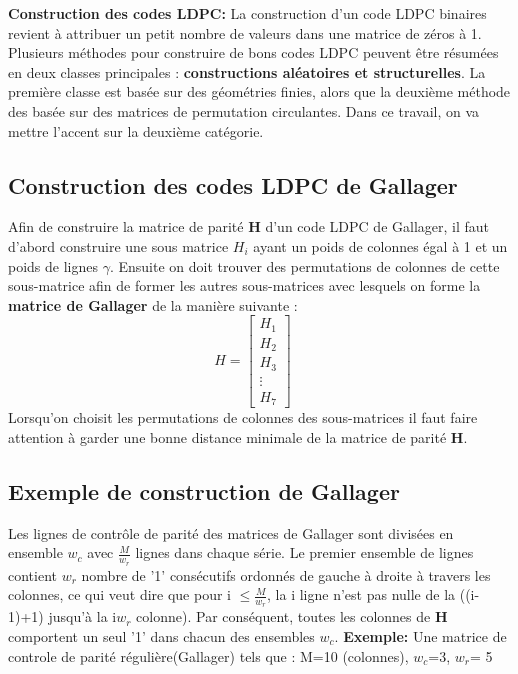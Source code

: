 \documentclass[french,nochapter,11pt]{rapportUB}
\begin{document}
\textbf{Construction des codes LDPC:} La construction d'un code LDPC binaires revient à attribuer un petit nombre de valeurs dans une matrice de zéros à 1. Plusieurs méthodes pour construire de bons codes LDPC peuvent être résumées en deux classes principales : \textbf{constructions aléatoires et structurelles}.
La première classe est basée sur des géométries finies, alors que la deuxième méthode des basée sur des matrices de permutation circulantes. \newline
Dans ce travail, on va mettre l'accent sur la deuxième catégorie. \newline
\subsection{Construction des codes LDPC de Gallager}
Afin de construire la matrice de parité \textbf{H} d'un code LDPC de Gallager, il faut d'abord construire une sous matrice \textbf{$H_i$} ayant un poids de colonnes égal à 1 et un poids de lignes $\gamma$. Ensuite on doit trouver des permutations de colonnes de cette sous-matrice afin de former les autres sous-matrices avec lesquels on forme la \textbf{matrice de Gallager} de la manière suivante :
$$H=
\begin{bmatrix}
  H_1 \\
  H_2 \\
  H_3 \\
  \vdots \\
  H_7
\end{bmatrix}
\quad
$$
\newline
Lorsqu'on choisit les permutations de colonnes des sous-matrices il faut faire attention à garder une bonne distance minimale de la matrice de parité \textbf{H}.
\subsection{Exemple de construction de Gallager}
Les lignes de contrôle de parité des matrices de Gallager sont divisées en ensemble $w_c$ avec $\frac{M}{w_r}$ lignes dans chaque série. Le premier ensemble de lignes contient $w_r$ nombre de '1' consécutifs ordonnés de gauche à droite à travers les colonnes, ce qui veut dire que pour i $\leq$$\frac{M}{w_r}$, la i ligne n'est pas nulle de la ((i-1)+1) jusqu'à la i$w_r$ colonne). \newline
Par conséquent, toutes les colonnes de \textbf{H} comportent un seul '1' dans chacun des ensembles $w_c$. \newline \newline
\textbf{Exemple:} Une matrice de controle de parité régulière(Gallager) tels que : M=10 (colonnes), $w_c$=3, $w_r$= 5\newline
\end{document}
